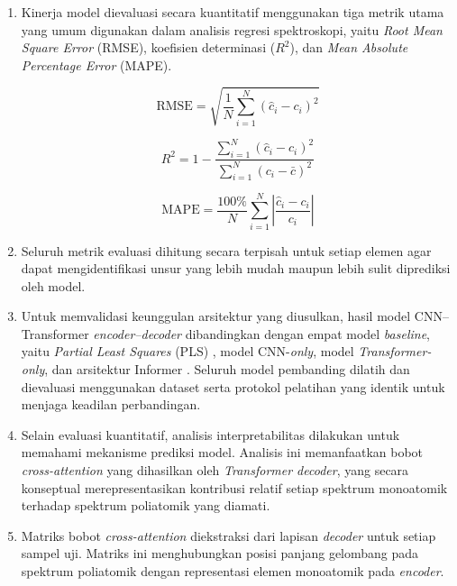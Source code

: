 \begin{enumerate}
    \item Kinerja model dievaluasi secara kuantitatif menggunakan tiga metrik utama yang umum digunakan dalam analisis regresi spektroskopi, yaitu \textit{Root Mean Square Error} (RMSE), koefisien determinasi ($R^2$), dan \textit{Mean Absolute Percentage Error} (MAPE).

\begin{equation} \label{eq:bab3_rmse}
\mathrm{RMSE} = \sqrt{\frac{1}{N}\sum_{i=1}^{N}\left(\hat{c}_i - c_i\right)^2}
\end{equation}

\begin{equation} \label{eq:bab3_r2}
R^2 = 1 - \frac{\sum_{i=1}^{N}(\hat{c}_i - c_i)^2}{\sum_{i=1}^{N}(c_i - \bar{c})^2}
\end{equation}

\begin{equation} \label{eq:bab3_mape}
\mathrm{MAPE} = \frac{100\%}{N}\sum_{i=1}^{N}\left|\frac{\hat{c}_i - c_i}{c_i}\right|
\end{equation}

    \item Seluruh metrik evaluasi dihitung secara terpisah untuk setiap elemen agar dapat mengidentifikasi unsur yang lebih mudah maupun lebih sulit diprediksi oleh model.

    \item Untuk memvalidasi keunggulan arsitektur yang diusulkan, hasil model CNN--Transformer \textit{encoder--decoder} dibandingkan dengan empat model \textit{baseline}, yaitu \textit{Partial Least Squares} (PLS) \citep{wold_pls_2001}, model CNN-\textit{only}, model \textit{Transformer-only}, dan arsitektur Informer \citep{zhou_informer_2021, walidain_informer-based_2026}. Seluruh model pembanding dilatih dan dievaluasi menggunakan dataset serta protokol pelatihan yang identik untuk menjaga keadilan perbandingan.

    \item Selain evaluasi kuantitatif, analisis interpretabilitas dilakukan untuk memahami mekanisme prediksi model. Analisis ini memanfaatkan bobot \textit{cross-attention} yang dihasilkan oleh \textit{Transformer decoder}, yang secara konseptual merepresentasikan kontribusi relatif setiap spektrum monoatomik terhadap spektrum poliatomik yang diamati.

    \item Matriks bobot \textit{cross-attention} diekstraksi dari lapisan \textit{decoder} untuk setiap sampel uji. Matriks ini menghubungkan posisi panjang gelombang pada spektrum poliatomik dengan representasi elemen monoatomik pada \textit{encoder}.


\end{enumerate}
